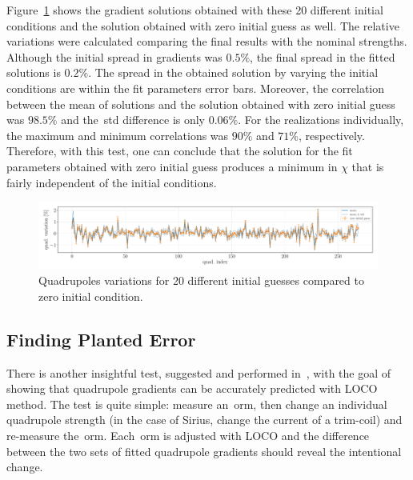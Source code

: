 Figure~\ref{fig:quad_stren_ini_guess} shows the gradient solutions obtained with these 20 different initial conditions and the solution obtained with zero initial guess as well. The relative variations were calculated comparing the final results with the nominal strengths. Although the initial spread in gradients was $0.5\%$, the final spread in the fitted solutions is $0.2\%$. The spread in the obtained solution by varying the initial conditions are within the fit parameters error bars. Moreover, the correlation between the mean of solutions and the solution obtained with zero initial guess was $98.5\%$ and the~\gls{std} difference is only $0.06\%$. For the realizations individually, the maximum and minimum correlations was $90\%$ and $71\%$, respectively. Therefore, with this test, one can conclude that the solution for the fit parameters obtained with zero initial guess produces a minimum in $\chi$ that is fairly independent of the initial conditions. 
\begin{figure}
\centering
\includegraphics[width=1.0\textwidth]{figures/quad_stren_initial_guess.pdf}
\caption{Quadrupoles variations for 20 different initial guesses compared to zero initial condition.}
\label{fig:quad_stren_ini_guess}
\end{figure}
\subsection{Finding Planted Error}
There is another insightful test, suggested and performed in~\cite{safranek1997}, with the goal of showing that quadrupole gradients can be accurately predicted with LOCO method. The test is quite simple: measure an~\gls{orm}, then change an individual quadrupole strength (in the case of Sirius, change the current of a trim-coil) and re-measure the~\gls{orm}. Each~\gls{orm} is adjusted with LOCO and the difference between the two sets of fitted quadrupole gradients should reveal the intentional change.

